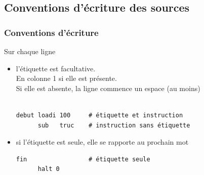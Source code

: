 \subsection{Conventions d'écriture des sources}
\begin{frame}[containsverbatim]
  \frametitle{Conventions d'écriture}

Sur chaque ligne 
\begin{itemize}
\item 
\alert{l'étiquette est facultative}.
\\ En colonne 1
si elle est présente. \\
Si elle est absente, \alert{la ligne commence un espace} (au moins)
\begin{verbatim}

debut loadi 100     # étiquette et instruction
      sub   truc    # instruction sans étiquette

\end{verbatim}

\item si \alert{l'étiquette est seule}, elle se rapporte au prochain mot
\begin{verbatim}
fin                 # étiquette seule
      halt 0

\end{verbatim}
\end{itemize}
\end{frame}
